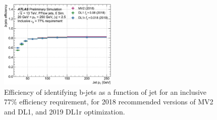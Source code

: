 \begin{figure}[htbp]
    \centering
    \includegraphics[width=0.5\textwidth]{Ch4/Img/b_jet_Eff_77.png}
    \caption{Efficiency of identifying b-jets as a function of jet \pT for an inclusive 77\% efficiency requirement, for 2018 recommended versions of MV2 and DL1, and 2019 DL1r optimization.}
    \label{fig:Jet:Tag:Dlr:Eff_77}
\end{figure}

